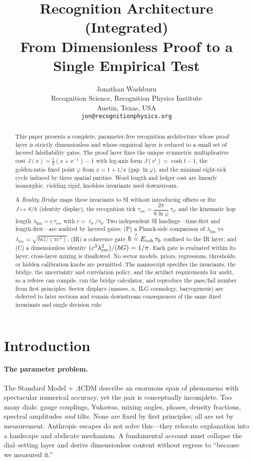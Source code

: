\documentclass[11pt]{article}
\title{\textbf{Recognition Architecture (Integrated)}\\
\large From Dimensionless Proof to a Single Empirical Test}
\author{Jonathan Washburn\\
Recognition Science, Recognition Physics Institute\\
Austin, Texas, USA\\
\texttt{jon@recognitionphysics.org}
}
\date{} %
\begin{document}
\maketitle

\begin{abstract}
\noindent
This paper presents a complete, parameter-free recognition architecture whose proof layer is strictly dimensionless and whose empirical layer is reduced to a small set of layered falsifiability gates. The proof layer fixes the unique symmetric multiplicative cost
\(J(x)=\tfrac{1}{2}\!\left(x+x^{-1}\right)-1\) with log-axis form \(J(e^{t})=\cosh t-1\), the golden‑ratio fixed point \(\varphi\) from \(x=1+1/x\) (gap \(\ln\varphi\)), and the minimal eight‑tick cycle induced by three spatial parities. Word length and ledger cost are linearly isomorphic, yielding rigid, knobless invariants used downstream.

A \emph{Reality Bridge} maps these invariants to SI without introducing offsets or fits:
\(J\mapsto S/\hbar\) (identity display), the recognition tick \(\tau_{\mathrm{rec}}=\dfrac{2\pi}{8\ln\varphi}\,\tau_{0}\), and the kinematic hop length \(\lambda_{\mathrm{kin}}=c\,\tau_{\mathrm{rec}}\) with \(c=\ell_{0}/\tau_{0}\). Two independent SI landings—time‑first and length‑first—are audited by layered gates: (P) a Planck‑side comparison of \(\lambda_{\mathrm{kin}}\) vs. \(\lambda_{\mathrm{rec}}=\sqrt{\hbar G/(\pi c^{3})}\); (IR) a coherence gate \(\hbar\overset{?}{=}E_{\rm coh}\,\tau_0\) confined to the IR layer; and (C) a dimensionless identity \((c^{3}\lambda_{\rm rec}^{2})/(\hbar G)=1/\pi\). Each gate is evaluated within its layer; cross‑layer mixing is disallowed.
No sector models, priors, regressions, thresholds, or hidden calibration knobs are permitted. The manuscript specifies the invariants, the bridge, the uncertainty and correlation policy, and the artifact requirements for audit, so a referee can compile, run the bridge calculator, and reproduce the pass/fail number from first principles. Sector displays (masses, \(\alpha\), ILG cosmology, baryogenesis) are deferred to later sections and remain downstream consequences of the same fixed invariants and single decision rule.
\end{abstract}


\section{Introduction}

\paragraph{The parameter problem.}
The Standard Model + \(\Lambda\)CDM describe an enormous span of phenomena with spectacular numerical accuracy, yet the pair is conceptually incomplete. Too many dials: gauge couplings, Yukawas, mixing angles, phases, density fractions, spectral amplitudes \emph{and} tilts. None are fixed by first principles; all are set by measurement. Anthropic escapes do not solve this—they relocate explanation into a landscape and abdicate mechanism. A fundamental account must collapse the dial–setting layer and derive dimensionless content without regress to “because we measured it.”
\end{document}
